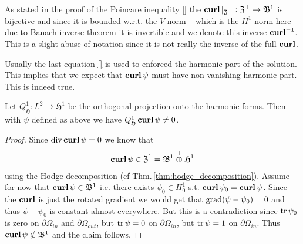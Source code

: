 \documentclass[../master_thesis.tex]{subfiles}
\begin{document}
As stated in the proof of the Poincare inequality \ref{} 
the $\veccurl| _{\mathfrak{Z}^\perp}: \mathfrak{Z}^\perp \rightarrow \mathfrak{B}^1$
is bijective and since it is bounded w.r.t. the $V$-norm -- which is the 
$H^1$-norm here -- due to Banach inverse theorem it is invertible and we denote this 
inverse $\veccurl^{-1}$. This is a slight abuse of notation since it is not really 
the inverse of the full $\veccurl$.

Usually the last equation \ref{} is used to enforced the harmonic part of the 
solution. This implies that we expect that $\veccurl \psi$ must have 
non-vanishing harmonic part. This is indeed true.
\begin{proposition}
    Let $Q_\mathfrak{H}^1: L^2 \rightarrow \mathfrak{H}^1$ be the orthogonal
    projection onto the harmonic forms. Then with $\psi$ defined as above 
    we have $Q_\mathfrak{H}^1\veccurl \psi \neq 0$.
\end{proposition}
\begin{proof}
    Since $\diver \veccurl \psi = 0$ we know that 
    \begin{align*}
        \veccurl \psi \in \mathfrak{Z}^1 = \mathfrak{B}^1 \stackrel{\perp}{\oplus} \mathfrak{H}^1
    \end{align*}
    using the Hodge decomposition (cf Thm.\,\ref{thm:hodge_decomposition}). 
    Assume for now that $\veccurl \psi \in \mathfrak{B}^1$ i.e. there exists 
    $\psi_0 \in H^1_0$ s.t. $\veccurl \psi_0 = \veccurl \psi$. 
    Since the $\veccurl$ is just the rotated gradient we would get that 
    $\grad (\psi - \psi_0) = 0$ and thus $\psi - \psi_0$ is constant almost 
    everywhere. But this is a contradiction since $\tr \psi_0$ is zero on $\partial\Omega_{in}$ 
    and $\partial \Omega_{out}$, but $\tr \psi = 0$ on $\partial\Omega_{in}$,
    but $\tr \psi = 1$ on $\partial\Omega_{in}$. 
    Thus $\veccurl \psi \notin \mathfrak{B}^1$ and the claim follows.
\end{proof}
\end{document}
